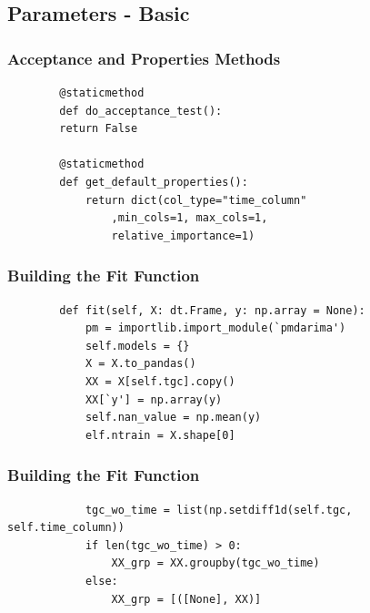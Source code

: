 \documentclass[11pt,
aspectratio=169,
hyperref={colorlinks}
]{beamer}
\begin{document}
\subsection{Parameters - Basic}
\begin{frame}[fragile]
        \frametitle{Acceptance and Properties Methods}
        \begin{verbatim}
        @staticmethod
        def do_acceptance_test():
        return False

        @staticmethod
        def get_default_properties():
            return dict(col_type="time_column"
                ,min_cols=1, max_cols=1,
                relative_importance=1)
        \end{verbatim}
\end{frame}
\begin{frame}[fragile]
        \frametitle{Building the Fit Function}
        \begin{verbatim}
        def fit(self, X: dt.Frame, y: np.array = None):
            pm = importlib.import_module(`pmdarima')
            self.models = {}
            X = X.to_pandas()
            XX = X[self.tgc].copy()
            XX[`y'] = np.array(y)
            self.nan_value = np.mean(y)
            elf.ntrain = X.shape[0]
        \end{verbatim}
\end{frame}
\begin{frame}[fragile]
        \frametitle{Building the Fit Function}
        \begin{verbatim}
            tgc_wo_time = list(np.setdiff1d(self.tgc, self.time_column))
            if len(tgc_wo_time) > 0:
                XX_grp = XX.groupby(tgc_wo_time)
            else:
                XX_grp = [([None], XX)]
        \end{verbatim}
\end{frame}
\end{document}

